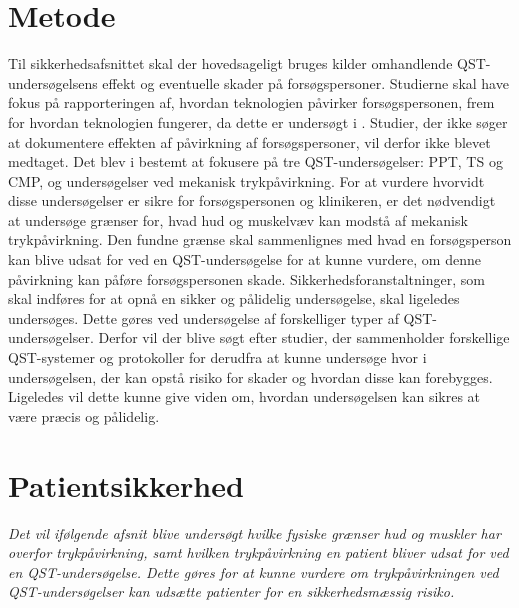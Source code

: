 \section{Metode}
Til sikkerhedsafsnittet skal der hovedsageligt bruges kilder omhandlende QST-undersøgelsens effekt og eventuelle skader på forsøgspersoner. Studierne skal have fokus på rapporteringen af, hvordan teknologien påvirker forsøgspersonen, frem for hvordan teknologien fungerer, da dette er undersøgt i . Studier, der ikke søger at dokumentere effekten af påvirkning af forsøgspersoner, vil derfor ikke blevet medtaget. Det blev i  bestemt at fokusere på tre QST-undersøgelser: PPT, TS og CMP, og undersøgelser ved mekanisk trykpåvirkning. For at vurdere hvorvidt disse undersøgelser er sikre for forsøgspersonen og klinikeren, er det nødvendigt at undersøge grænser for, hvad hud og muskelvæv kan modstå af mekanisk trykpåvirkning. Den fundne grænse skal sammenlignes med hvad en forsøgsperson kan blive udsat for ved en QST-undersøgelse for at kunne vurdere, om denne påvirkning kan påføre forsøgspersonen skade. Sikkerhedsforanstaltninger, som skal indføres for at opnå en sikker og pålidelig undersøgelse, skal ligeledes undersøges. Dette gøres ved undersøgelse af forskelliger typer af QST-undersøgelser. Derfor vil der blive søgt efter studier, der sammenholder forskellige QST-systemer og protokoller for derudfra at kunne undersøge hvor i undersøgelsen, der kan opstå risiko for skader og hvordan disse kan forebygges. Ligeledes vil dette kunne give viden om, hvordan undersøgelsen kan sikres at være præcis og pålidelig. \citep{HTAcore}

\section{Patientsikkerhed}
\textit{Det vil ifølgende afsnit blive undersøgt hvilke fysiske grænser hud og muskler har overfor trykpåvirkning, samt hvilken trykpåvirkning en patient bliver udsat for ved en QST-undersøgelse. Dette gøres for at kunne vurdere om trykpåvirkningen ved QST-undersøgelser kan udsætte patienter for en sikkerhedsmæssig risiko.}


